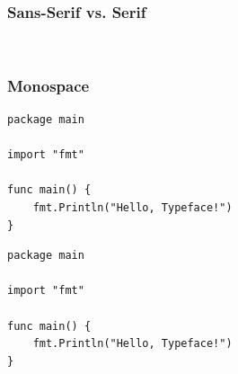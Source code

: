 \documentclass{beamer}
\begin{document}
\begin{frame}
  \frametitle{Sans-Serif vs. Serif}

  \\[1cm]


\end{frame}

\begin{frame}[fragile=singleslide]\frametitle{Monospace}

 

\begin{lstlisting}
package main

import "fmt"

func main() {
	fmt.Println("Hello, Typeface!")
}
\end{lstlisting}
    

\begin{lstlisting}
package main

import "fmt"

func main() {
	fmt.Println("Hello, Typeface!")
}
\end{lstlisting}
    

\end{frame}
\end{document}

